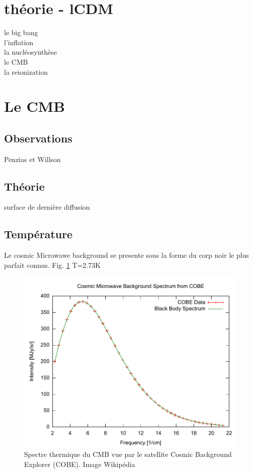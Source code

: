 \section{théorie - lCDM}

le big bang\\
l'inflation\\
la nucléosynthèse\\
le CMB\\
la reionization


\section{Le CMB}


\subsection{Observations}
Penzias et Willson\\

\subsection{Théorie}
surface de dernière diffusion\\


\subsection{Température}
Le cosmic Microwawe background se presente sous la forme du corp noir le plus parfait connus.
Fig. \ref{fig:cmb_thermal_spectrum}
T=2.73K


\begin{figure}[bth]
        \includegraphics[width=.95\linewidth]{img/01/Cmbr.pdf} 
        \caption{Spectre thermique du CMB vue par le satellite Cosmic Background Explorer (COBE). 
        Image Wikipédia}
 		\label{fig:cmb_thermal_spectrum}
\end{figure}





